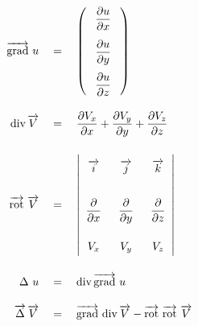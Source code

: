 \begin{align*}
	\overrightarrow{\text{grad}}~u \quad                  & = \quad
	\left(
	\begin{array}{c}
			\makebox[2em]{\hspace{0.2em} $\dfrac{\partial u}{\partial x}$ \hspace{0.2em}} \\[1.2em]
			\makebox[2em]{\hspace{0.2em} $\dfrac{\partial u}{\partial y}$ \hspace{0.2em}} \\[1.2em]
			\makebox[2em]{\hspace{0.2em} $\dfrac{\partial u}{\partial z}$ \hspace{0.2em}} \\
		\end{array}
	\right)                                                                                                                                                             \\[1em]
	\text{div}\, \overrightarrow{V} \quad                 & = \quad \frac{\partial V_x}{\partial x} + \frac{\partial V_y}{\partial y} + \frac{\partial V_z}{\partial z} \\[1em]
	\overrightarrow{\text{rot}}\ \overrightarrow{V} \quad & = \quad
	\left|
	\begin{array}{c@{\hskip 1.5em}c@{\hskip 1.5em}c}
		\rule{0pt}{4ex}
		\overrightarrow{i}           & \overrightarrow{j}           & \overrightarrow{k}           \\[2em]
		\rule{0pt}{3ex}
		\dfrac{\partial}{\partial x} & \dfrac{\partial}{\partial y} & \dfrac{\partial}{\partial z} \\[2em]
		V_x                          & V_y                          & V_z                          \\[-2ex]
		\rule{0pt}{1ex}
	\end{array}
	\right|                                                                                                                                                             \\[1em]
	\Delta~u \quad                                        & = \quad \text{div}\, \overrightarrow{\text{grad}}\ u                                                        \\[1em]
	\overrightarrow{\Delta}\, \overrightarrow{V} \quad    & = \quad
	\overrightarrow{\text{grad}}\ \text{div}\, \overrightarrow{V} - \overrightarrow{\text{rot}}\ \overrightarrow{\text{rot}}\ \overrightarrow{V}
\end{align*}

